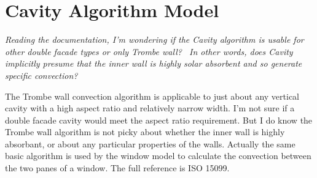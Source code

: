 \section{Cavity Algorithm Model}\label{cavity-algorithm-model}

\emph{Reading the documentation, I'm wondering if the Cavity algorithm is usable for other double facade types or only Trombe wall?~ In other words, does Cavity implicitly presume that the inner wall is highly solar absorbent and so generate specific convection?}

The Trombe wall convection algorithm is applicable to just about any vertical cavity with a high aspect ratio and relatively narrow width. I'm not sure if a double facade cavity would meet the aspect ratio requirement. But I do know the Trombe wall algorithm is not picky about whether the inner wall is highly absorbant, or about any particular properties of the walls. Actually the same basic algorithm is used by the window model to calculate the convection between the two panes of a window. The full reference is ISO 15099.
